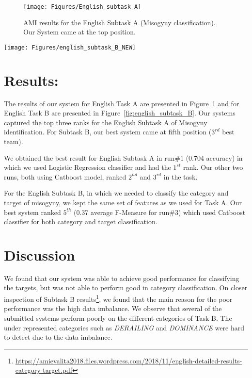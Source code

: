 \documentclass[11pt]{article}
\begin{document}
\begin{figure}[!t]
	\centering
	\texttt{[image: Figures/English\_subtask\_A]}
	\caption{AMI results for the English Subtask A (Misogyny classification). Our System came at the top position.}
	\label{fig:english_subtask_A}
\end{figure}

\begin{figure*}[h!]
	\centering
	\texttt{[image: Figures/english\_subtask\_B\_NEW]}
	\caption{AMI results for the English Subtask B (Category and target classification). Out best system came at 5$^{th}$ position (3$^{rd}$ best team).}
	\label{fig:english_subtask_B}
\end{figure*}
\section{Results: }

The results of our system for English Task A are presented in Figure~\ref{fig:english_subtask_A} and for English Task B are presented in Figure~\ref{fig:english_subtask_B}. Our systems captured the top three ranks for the English Subtask A of Misogyny identification. For Subtask B, our best system came at fifth position ($3^{rd}$ best team).


We obtained the best result for English Subtask A in run\#1 (0.704 accuracy) in which we used Logistic Regression classifier and had the $1^{st}$ rank. Our other two runs, both using Catboost model, ranked $2^{nd}$ and $3^{rd}$ in the task.

For the English Subtask B, in which we needed to classify the category and target of misogyny, we kept the same set of features as we used for Task A. Our best system ranked $5^{th}$ (0.37 average F-Measure for run\#3) which used Catboost classifier for both category and target classification.













\section{Discussion}

We found that our system was able to achieve good performance for classifying the targets, but was not able to perform good in category classification. On closer inspection of Subtask B results\footnote{\url{https://amievalita2018.files.wordpress.com/2018/11/english-detailed-results-category-target.pdf}}, we found that the main reason for the poor performance was the high data imbalance. We observe that several of the submitted systems perform poorly on the different categories of Task B. The under represented categories such as \textit{DERAILING} and \textit{DOMINANCE} were hard to detect due to the data imbalance.
\end{document}
